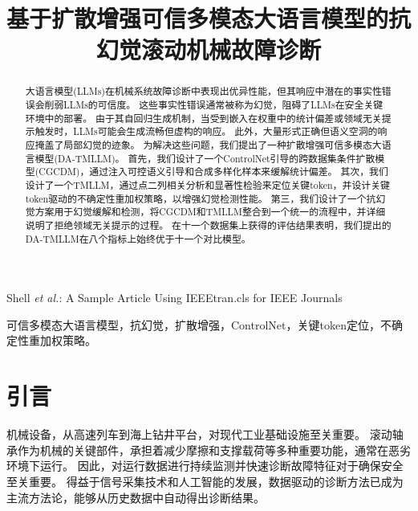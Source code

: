 \documentclass[UTF8,lettersize,journal]{IEEEtran}
\begin{document}
\title{基于扩散增强可信多模态大语言模型的抗幻觉滚动机械故障诊断}

%
{Shell \MakeLowercase{\textit{et al.}}: A Sample Article Using IEEEtran.cls for IEEE Journals}


\maketitle

\begin{abstract}
大语言模型(LLMs)在机械系统故障诊断中表现出优异性能，但其响应中潜在的事实性错误会削弱LLMs的可信度。
这些事实性错误通常被称为幻觉，阻碍了LLMs在安全关键环境中的部署。
由于其自回归生成机制，当受到嵌入在权重中的统计偏差或领域无关提示触发时，LLMs可能会生成流畅但虚构的响应。
此外，大量形式正确但语义空洞的响应掩盖了局部幻觉的迹象。
为解决这些问题，我们提出了一种扩散增强可信多模态大语言模型(DA-TMLLM)。
首先，我们设计了一个ControlNet引导的跨数据集条件扩散模型(CGCDM)，通过注入可控语义引导和合成多样化样本来缓解统计偏差。
其次，我们设计了一个TMLLM，通过点二列相关分析和显著性检验来定位关键token，并设计关键token驱动的不确定性重加权策略，以增强幻觉检测性能。
第三，我们设计了一个抗幻觉方案用于幻觉缓解和检测，将CGCDM和TMLLM整合到一个统一的流程中，并详细说明了拒绝领域无关提示的过程。
在十一个数据集上获得的评估结果表明，我们提出的DA-TMLLM在八个指标上始终优于十一个对比模型。
\end{abstract}
\begin{IEEEkeywords}
可信多模态大语言模型，抗幻觉，扩散增强，ControlNet，关键token定位，不确定性重加权策略。


\end{IEEEkeywords}

\section{引言}
机械设备，从高速列车到海上钻井平台，对现代工业基础设施至关重要。
滚动轴承作为机械的关键部件，承担着减少摩擦和支撑载荷等多种重要功能，通常在恶劣环境下运行\cite{PU, JUST}。
因此，对运行数据进行持续监测并快速诊断故障特征对于确保安全至关重要。
得益于信号采集技术和人工智能的发展，数据驱动的诊断方法已成为主流方法论，能够从历史数据中自动得出诊断结果\cite{10577994, HIT}。
\end{document}
